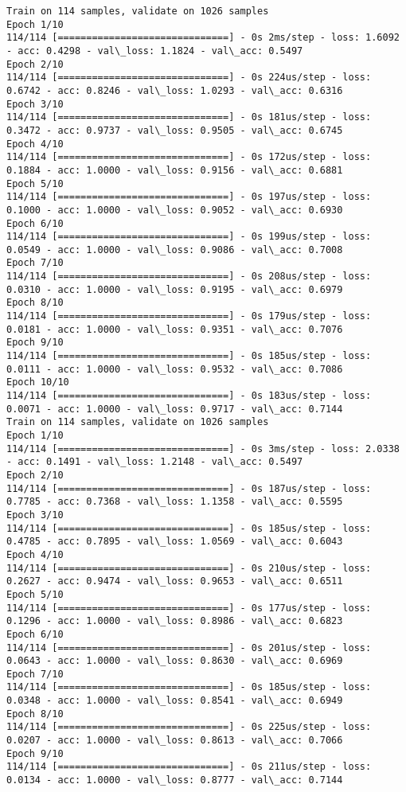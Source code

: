 \documentclass[11pt]{article}
\begin{document}
\begin{Verbatim}[commandchars=\\\{\}]
Train on 114 samples, validate on 1026 samples
Epoch 1/10
114/114 [==============================] - 0s 2ms/step - loss: 1.6092 - acc: 0.4298 - val\_loss: 1.1824 - val\_acc: 0.5497
Epoch 2/10
114/114 [==============================] - 0s 224us/step - loss: 0.6742 - acc: 0.8246 - val\_loss: 1.0293 - val\_acc: 0.6316
Epoch 3/10
114/114 [==============================] - 0s 181us/step - loss: 0.3472 - acc: 0.9737 - val\_loss: 0.9505 - val\_acc: 0.6745
Epoch 4/10
114/114 [==============================] - 0s 172us/step - loss: 0.1884 - acc: 1.0000 - val\_loss: 0.9156 - val\_acc: 0.6881
Epoch 5/10
114/114 [==============================] - 0s 197us/step - loss: 0.1000 - acc: 1.0000 - val\_loss: 0.9052 - val\_acc: 0.6930
Epoch 6/10
114/114 [==============================] - 0s 199us/step - loss: 0.0549 - acc: 1.0000 - val\_loss: 0.9086 - val\_acc: 0.7008
Epoch 7/10
114/114 [==============================] - 0s 208us/step - loss: 0.0310 - acc: 1.0000 - val\_loss: 0.9195 - val\_acc: 0.6979
Epoch 8/10
114/114 [==============================] - 0s 179us/step - loss: 0.0181 - acc: 1.0000 - val\_loss: 0.9351 - val\_acc: 0.7076
Epoch 9/10
114/114 [==============================] - 0s 185us/step - loss: 0.0111 - acc: 1.0000 - val\_loss: 0.9532 - val\_acc: 0.7086
Epoch 10/10
114/114 [==============================] - 0s 183us/step - loss: 0.0071 - acc: 1.0000 - val\_loss: 0.9717 - val\_acc: 0.7144
Train on 114 samples, validate on 1026 samples
Epoch 1/10
114/114 [==============================] - 0s 3ms/step - loss: 2.0338 - acc: 0.1491 - val\_loss: 1.2148 - val\_acc: 0.5497
Epoch 2/10
114/114 [==============================] - 0s 187us/step - loss: 0.7785 - acc: 0.7368 - val\_loss: 1.1358 - val\_acc: 0.5595
Epoch 3/10
114/114 [==============================] - 0s 185us/step - loss: 0.4785 - acc: 0.7895 - val\_loss: 1.0569 - val\_acc: 0.6043
Epoch 4/10
114/114 [==============================] - 0s 210us/step - loss: 0.2627 - acc: 0.9474 - val\_loss: 0.9653 - val\_acc: 0.6511
Epoch 5/10
114/114 [==============================] - 0s 177us/step - loss: 0.1296 - acc: 1.0000 - val\_loss: 0.8986 - val\_acc: 0.6823
Epoch 6/10
114/114 [==============================] - 0s 201us/step - loss: 0.0643 - acc: 1.0000 - val\_loss: 0.8630 - val\_acc: 0.6969
Epoch 7/10
114/114 [==============================] - 0s 185us/step - loss: 0.0348 - acc: 1.0000 - val\_loss: 0.8541 - val\_acc: 0.6949
Epoch 8/10
114/114 [==============================] - 0s 225us/step - loss: 0.0207 - acc: 1.0000 - val\_loss: 0.8613 - val\_acc: 0.7066
Epoch 9/10
114/114 [==============================] - 0s 211us/step - loss: 0.0134 - acc: 1.0000 - val\_loss: 0.8777 - val\_acc: 0.7144

\end{Verbatim}
\end{document}
